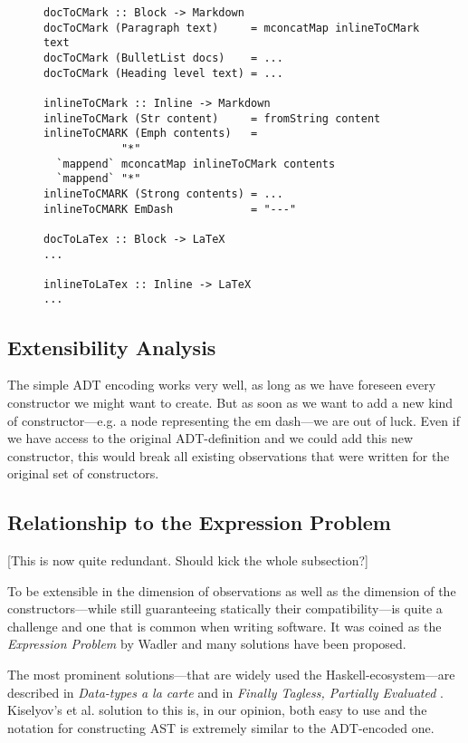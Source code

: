 \begin{figure}
\begin{lstlisting}
docToCMark :: Block -> Markdown
docToCMark (Paragraph text)     = mconcatMap inlineToCMark text
docToCMark (BulletList docs)    = ...
docToCMark (Heading level text) = ...

inlineToCMark :: Inline -> Markdown
inlineToCMark (Str content)     = fromString content
inlineToCMARK (Emph contents)   =
            "*"
  `mappend` mconcatMap inlineToCMark contents
  `mappend` "*"
inlineToCMARK (Strong contents) = ...
inlineToCMARK EmDash            = "---"

docToLaTex :: Block -> LaTeX
...

inlineToLaTex :: Inline -> LaTeX
...
\end{lstlisting}
\end{figure}


\subsection{Extensibility Analysis}

The simple ADT encoding works very well, as long as we have foreseen every
constructor we might want to create. But as soon as we want to add a new kind of
constructor—e.g. a node representing the em dash—we are out of luck. Even if we
have access to the original ADT-definition and we could add this new
constructor, this would break all existing observations that were written for
the original set of constructors.

\subsection{Relationship to the Expression Problem}

[This is now quite redundant. Should kick the whole subsection?]

To be extensible in the dimension of observations as well as the dimension of
the constructors—while still guaranteeing statically their compatibility—is
quite a challenge and one that is common when writing software. It was coined as
the \emph{Expression Problem} by Wadler \cite{expression-problem} and many
solutions have been proposed.

The most prominent solutions—that are widely used the Haskell-ecosystem—are
described in \emph{Data-types a la carte} \cite{data-types-a-la-carte} and in
\emph{Finally Tagless, Partially Evaluated} \cite{finally-tagless}. Kiselyov’s
et al. solution to this is, in our opinion, both easy to use and the notation
for constructing AST is extremely similar to the ADT-encoded one.


